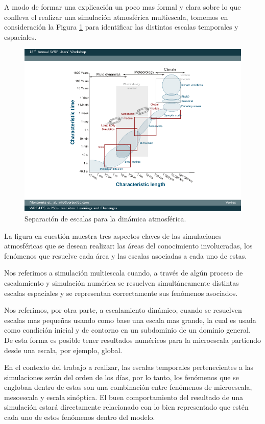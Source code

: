A modo de formar una explicación un poco mas formal y clara sobre lo que conlleva el realizar una simulación atmosférica multiescala, tomemos en consideración la Figura \ref{fig:escalas} para identificar las distintas escalas temporales y espaciales.

\begin{figure}[h!]
	\centering
	\includegraphics[width=0.85\linewidth,trim={2.6cm 1.4cm 1.5cm 0.8cm},clip]{Imagenes/01/terra}
	\caption{Separación de escalas para la dinámica atmosférica.}
	\label{fig:escalas}
\end{figure}

La figura en cuestión muestra tres aspectos claves de las simulaciones atmosféricas que se desean realizar: las áreas del conocimiento involucradas, los fenómenos que resuelve cada área y las escalas asociadas a cada uno de estas.

Nos referimos a simulación multiescala cuando, a través de algún proceso de escalamiento y simulación numérica se resuelven simultáneamente distintas escalas espaciales y se representan correctamente sus fenómenos asociados.
 
Nos referimos, por otra parte, a escalamiento dinámico, cuando se resuelven escalas mas pequeñas usando como base una escala mas grande, la cual es usada como condición inicial y de contorno en un subdominio de un dominio general. De esta forma es posible tener resultados numéricos para la microescala partiendo desde una escala, por ejemplo, global. 

En el contexto del trabajo a realizar, las escalas temporales pertenecientes a las simulaciones serán del orden de los días, por lo tanto, los fenómenos que se engloban dentro de estas son una combinación entre fenómenos de microescala, mesoescala y escala sinóptica. El buen comportamiento del resultado de una simulación estará directamente relacionado con lo bien representado que estén cada uno de estos fenómenos dentro del modelo.


